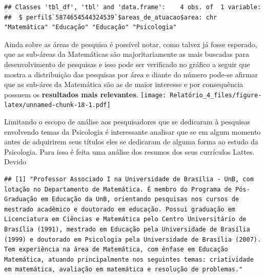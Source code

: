 \documentclass[]{article}
\newenvironment{Shaded}{\begin{snugshade}}{\end{snugshade}}
\newcommand{\DataTypeTok}[1]{\textcolor[rgb]{0.13,0.29,0.53}{#1}}
\newcommand{\StringTok}[1]{\textcolor[rgb]{0.31,0.60,0.02}{#1}}
\newcommand{\OperatorTok}[1]{\textcolor[rgb]{0.81,0.36,0.00}{\textbf{#1}}}
\newcommand{\NormalTok}[1]{#1}
\begin{document}
\begin{verbatim}
## Classes 'tbl_df', 'tbl' and 'data.frame':    4 obs. of  1 variable:
##  $ perfil$`5874654544324539`$areas_de_atuacao$area: chr  "Matemática" "Educação" "Educação" "Psicologia"
\end{verbatim}

Ainda sobre as áreas de pesquisa é possível notar, como talvez já fosse
esperado, que as sub-áreas da Matemáticas são majoritariamente as mais
buscadas para desenvolvimento de pesquisas e isso pode ser verificado no
gráfico a seguir que mostra a distribuição das pesquisas por área e
diante do número pode-se afirmar que as sub-áres da Matemática são as de
maior interesse e por consequência possuem os \textbf{resultados mais
relevantes}.
\texttt{[image: Relatório\_4\_files/figure-latex/unnamed-chunk-18-1.pdf]}

Limitando o escopo de análise aos pesquisadores que se dedicaram à
pesquisas envolvendo temas da Psicologia é interessante analisar que se
em algum momento antes de adquirirem seus títulos eles se dedicaram de
alguma forma ao estudo da Psicologia. Para isso é feita uma análise dos
resumos dos seus currículos Lattes. Devido

\begin{Shaded}
\end{Shaded}

\begin{verbatim}
## [1] "Professor Associado I na Universidade de Brasília - UnB, com lotação no Departamento de Matemática. É membro do Programa de Pós-Graduação em Educação da UnB, orientando pesquisas nos cursos de mestrado acadêmico e doutorado em educação. Possui graduação em Licenciatura em Ciências e Matemática pelo Centro Universitário de Brasília (1991), mestrado em Educação pela Universidade de Brasília (1999) e doutorado em Psicologia pela Universidade de Brasília (2007). Tem experiência na área de Matemática, com ênfase em Educação Matemática, atuando principalmente nos seguintes temas: criatividade em matemática, avaliação em matemática e resolução de problemas."
\end{verbatim}
\end{document}
